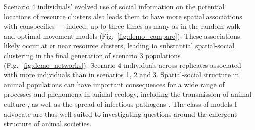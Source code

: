 \begin{interludeenv}
Scenario 4 individuals' evolved use of social information on the potential locations of resource clusters also leads them to have more spatial associations with conspecifics --- indeed, up to three times as many as in the random walk and optimal movement models (Fig.~\ref{fig:demo_compare}).
These associations likely occur at or near resource clusters, leading to substantial spatial-social clustering in the final generation of scenario 3 populations (Fig.~\ref{fig:demo_networks}).
Scenario 4 individuals across replicates associated with more individuals than in scenarios 1, 2 and 3.
Spatial-social structure in animal populations can have important consequences for a wide range of processes and phenomena in animal ecology, including the transmission of animal culture \citep[such as foraging tactics or migration routes][]{romano2020,romano2021}, as well as the spread of infectious pathogens \citep{white2017,white2018}.
The class of models I advocate are thus well suited to investigating questions around the emergent structure of animal societies.


\end{interludeenv}
